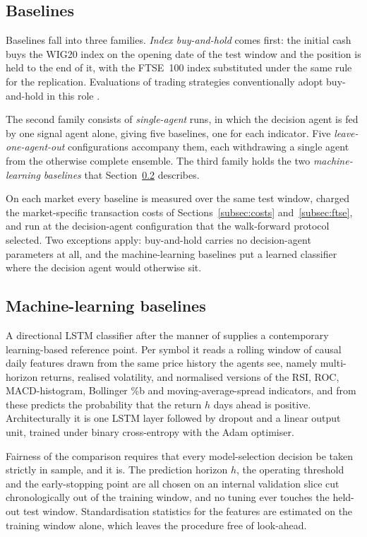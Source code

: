 \subsection{Baselines}\label{subsec:baselines}

Baselines fall into three families. \emph{Index buy-and-hold} comes first: the initial cash buys the WIG20 index on the opening date of the test window and the position is held to the end of it, with the FTSE~100 index substituted under the same rule for the replication. Evaluations of trading strategies conventionally adopt buy-and-hold in this role \cite{dichtl2020}.

The second family consists of \emph{single-agent} runs, in which the decision agent is fed by one signal agent alone, giving five baselines, one for each indicator. Five \emph{leave-one-agent-out} configurations accompany them, each withdrawing a single agent from the otherwise complete ensemble. The third family holds the two \emph{machine-learning baselines} that Section~\ref{subsec:lstm} describes.

On each market every baseline is measured over the same test window, charged the market-specific transaction costs of Sections~\ref{subsec:costs} and~\ref{subsec:ftse}, and run at the decision-agent configuration that the walk-forward protocol selected. Two exceptions apply: buy-and-hold carries no decision-agent parameters at all, and the machine-learning baselines put a learned classifier where the decision agent would otherwise sit.

\subsection{Machine-learning baselines}\label{subsec:lstm}

A directional LSTM classifier after the manner of \cite{fischerkrauss2018} supplies a contemporary learning-based reference point. Per symbol it reads a rolling window of causal daily features drawn from the same price history the agents see, namely multi-horizon returns, realised volatility, and normalised versions of the RSI, ROC, MACD-histogram, Bollinger \%b and moving-average-spread indicators, and from these predicts the probability that the return $h$ days ahead is positive. Architecturally it is one LSTM layer followed by dropout and a linear output unit, trained under binary cross-entropy with the Adam optimiser.

Fairness of the comparison requires that every model-selection decision be taken strictly in sample, and it is. The prediction horizon $h$, the operating threshold and the early-stopping point are all chosen on an internal validation slice cut chronologically out of the training window, and no tuning ever touches the held-out test window. Standardisation statistics for the features are estimated on the training window alone, which leaves the procedure free of look-ahead.

